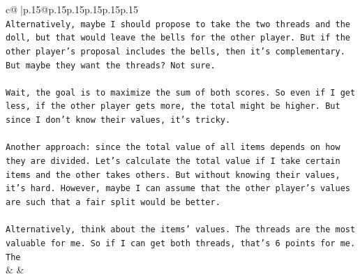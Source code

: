 \documentclass{article}
\begin{document}
{\begin{supertabular}{c@{$\;$}|p{.15\linewidth}@{}p{.15\linewidth}p{.15\linewidth}p{.15\linewidth}p{.15\linewidth}p{.15\linewidth}}
{{{\\ 
\texttt{Alternatively, maybe I should propose to take the two threads and the doll, but that would leave the bells for the other player. But if the other player's proposal includes the bells, then it's complementary. But maybe they want the threads? Not sure.} \\
\\ 
\texttt{Wait, the goal is to maximize the sum of both scores. So even if I get less, if the other player gets more, the total might be higher. But since I don't know their values, it's tricky.} \\
\\ 
\texttt{Another approach: since the total value of all items depends on how they are divided. Let's calculate the total value if I take certain items and the other takes others. But without knowing their values, it's hard. However, maybe I can assume that the other player's values are such that a fair split would be better.} \\
\\ 
\texttt{Alternatively, think about the items' values. The threads are the most valuable for me. So if I can get both threads, that's 6 points for me. The} \\
            }
        }
    }
    & & \\ \\


\end{supertabular}}
\end{document}

